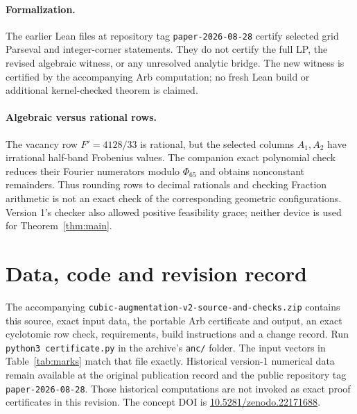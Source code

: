\documentclass[11pt]{article}
\theoremstyle{definition}\newtheorem{definition}[theorem]{Definition}
\theoremstyle{remark}\newtheorem{remark}[theorem]{Remark}
\begin{document}
\paragraph{Formalization.}
The earlier Lean files at repository tag \texttt{paper-2026-08-28} certify
selected grid Parseval and integer-corner statements. They do not certify
the full LP, the revised algebraic witness, or any unresolved analytic
bridge. The new witness is certified by the accompanying Arb computation;
no fresh Lean build or additional kernel-checked theorem is claimed.

\paragraph{Algebraic versus rational rows.}
The vacancy row $F'=4128/33$ is rational, but the selected columns $A_1,A_2$
have irrational half-band Frobenius values. The companion exact polynomial
check reduces their Fourier numerators modulo $\Phi_{65}$ and obtains
nonconstant remainders. Thus rounding rows to decimal rationals and checking
Fraction arithmetic is not an exact check of the corresponding geometric
configurations. Version 1's checker also allowed positive feasibility grace;
neither device is used for Theorem~\ref{thm:main}.

\section*{Data, code and revision record}
The accompanying \texttt{cubic-augmentation-v2-}\allowbreak\texttt{source-and-checks.zip} contains
this source, exact input data, the portable Arb certificate and output,
an exact cyclotomic row check, requirements, build instructions and a change
record. Run \texttt{python3 certificate.py} in the archive's \texttt{anc/} folder.
The input vectors in Table~\ref{tab:marks} match that file exactly. Historical
version-1 numerical data remain available at the original publication record
and the public repository tag \texttt{paper-2026-08-28}. Those historical
computations are not invoked as exact proof certificates in this revision.
The concept DOI is
\href{https://doi.org/10.5281/zenodo.22171688}{10.5281/zenodo.22171688}.
\end{document}
